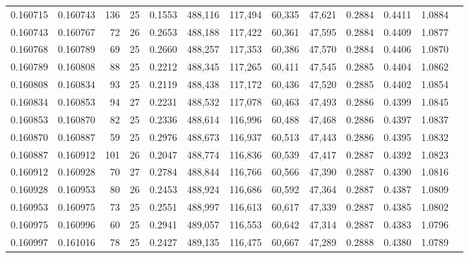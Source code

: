 \begin{tabular}{rrrrrrrrrrrrr}
0.160715 & 0.160743 &   136 &  25 &                                     0.1553 & 488,116 & 117,494 &  60,335 &  47,621 & 0.2884 & 0.4411 & 1.0884 \\
0.160743 & 0.160767 &    72 &  26 &                                     0.2653 & 488,188 & 117,422 &  60,361 &  47,595 & 0.2884 & 0.4409 & 1.0877 \\
0.160768 & 0.160789 &    69 &  25 &                                     0.2660 & 488,257 & 117,353 &  60,386 &  47,570 & 0.2884 & 0.4406 & 1.0870 \\
0.160789 & 0.160808 &    88 &  25 &                                     0.2212 & 488,345 & 117,265 &  60,411 &  47,545 & 0.2885 & 0.4404 & 1.0862 \\
0.160808 & 0.160834 &    93 &  25 &                                     0.2119 & 488,438 & 117,172 &  60,436 &  47,520 & 0.2885 & 0.4402 & 1.0854 \\
0.160834 & 0.160853 &    94 &  27 &                                     0.2231 & 488,532 & 117,078 &  60,463 &  47,493 & 0.2886 & 0.4399 & 1.0845 \\
0.160853 & 0.160870 &    82 &  25 &                                     0.2336 & 488,614 & 116,996 &  60,488 &  47,468 & 0.2886 & 0.4397 & 1.0837 \\
0.160870 & 0.160887 &    59 &  25 &                                     0.2976 & 488,673 & 116,937 &  60,513 &  47,443 & 0.2886 & 0.4395 & 1.0832 \\
0.160887 & 0.160912 &   101 &  26 &                                     0.2047 & 488,774 & 116,836 &  60,539 &  47,417 & 0.2887 & 0.4392 & 1.0823 \\
0.160912 & 0.160928 &    70 &  27 &                                     0.2784 & 488,844 & 116,766 &  60,566 &  47,390 & 0.2887 & 0.4390 & 1.0816 \\
0.160928 & 0.160953 &    80 &  26 &                                     0.2453 & 488,924 & 116,686 &  60,592 &  47,364 & 0.2887 & 0.4387 & 1.0809 \\
0.160953 & 0.160975 &    73 &  25 &                                     0.2551 & 488,997 & 116,613 &  60,617 &  47,339 & 0.2887 & 0.4385 & 1.0802 \\
0.160975 & 0.160996 &    60 &  25 &                                     0.2941 & 489,057 & 116,553 &  60,642 &  47,314 & 0.2887 & 0.4383 & 1.0796 \\
0.160997 & 0.161016 &    78 &  25 &                                     0.2427 & 489,135 & 116,475 &  60,667 &  47,289 & 0.2888 & 0.4380 & 1.0789 \\

\end{tabular}

